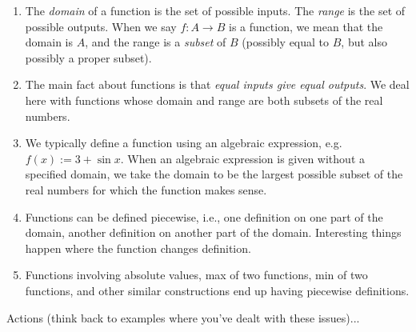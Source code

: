 \documentclass{amsart}
\begin{document}
\begin{enumerate}

\item The {\em domain} of a function is the set of possible
  inputs. The {\em range} is the set of possible outputs. When we say
  $f:A \to B$ is a function, we mean that the domain is $A$, and the
  range is a {\em subset} of $B$ (possibly equal to $B$, but also
  possibly a proper subset).
\item The main fact about functions is that {\em equal inputs give
  equal outputs}. We deal here with functions whose domain and range
  are both subsets of the real numbers.
\item We typically define a function using an algebraic expression,
  e.g. $f(x) := 3 + \sin x$. When an algebraic expression is given
  without a specified domain, we take the domain to be the largest
  possible subset of the real numbers for which the function makes
  sense.
\item Functions can be defined piecewise, i.e., one definition on one
  part of the domain, another definition on another part of the
  domain. Interesting things happen where the function changes
  definition.
\item Functions involving absolute values, max of two functions, min
  of two functions, and other similar constructions end up having
  piecewise definitions.
\end{enumerate}

Actions (think back to examples where you've dealt with these issues)...
\end{document}
